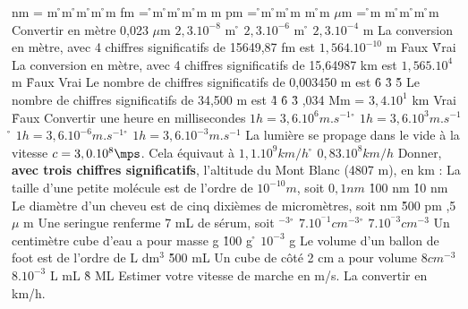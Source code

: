  nm =
\rv
\moinsneuf m
\r
\moinssix m
\r
\moinstrois m
\r
\moinsdouze m
\r
\moinsquinze m
 fm =
\r
\moinsneuf m
\r
\moinssix m
\r
\moinstrois m
\r
\moinsdouze m
\rv
\moinsquinze m
 pm =
\r
\moinsneuf m
\r
\moinssix m
\r
\moinstrois m
\rv
\moinsdouze m
\r
\moinsquinze m
 $\mu$m =
\r
\moinsneuf m
\rv
\moinssix m
\r
\moinstrois m
\r
\moinsdouze m
\r
\moinsquinze m
\q
Convertir en mètre 0,023 $\mu$m
\rv
$2,3. 10^{-8}$ m
\r
$2,3. 10^{-6}$ m
\r
$2,3. 10^{-4}$ m
\q
La conversion en mètre, avec 4 chiffres significatifs de 15649,87 fm est $1,564.10^{-10}$ m
\rv 
Faux
\r
Vrai
\q
La conversion en mètre, avec 4 chiffres significatifs de 15,64987 km est $1,565.10^4$ m
\r 
Faux
\rv
Vrai
\q
Le nombre de chiffres significatifs de 0,003450 m est
\r
6
\r
3
\r
5
\q
Le nombre de chiffres significatifs de 34,500 m est
\r
4
\r
6
\r
3
,034 Mm = $3,4.10^1$ km
\rv
Vrai
\r
Faux
\q
Convertir une heure en millisecondes
\rv
$1 h = 3,6.10^6 m.s^{-1}$
\r
$1 h = 3,6.10^3 m.s^{-1}$
\r
$1 h = 3,6.10^{-6} m.s^{-1}$
\r
$1 h = 3,6.10^{-3} m.s^{-1}$
\q
La lumière se propage dans le vide à  la vitesse $c=3,0.10^8\mps$.
Cela équivaut à  
\rv
$1,1.10^9 km/h$
\r
$0,83.10^8 km/h$
\q 
Donner, \textbf{avec trois chiffres significatifs}, l'altitude du Mont Blanc	(4807 m), en km :
\q
La taille d'une petite molécule	est de l'ordre de $10^{-10} m$, soit
\rv
$0,1 nm$
\r
100 nm
\r
10 nm	
\q
Le diamètre d'un cheveu	est de cinq dixièmes de micromètres, soit
 nm
\r
500 pm
,5 $\mu$ m
\q 
Une seringue renferme 7 mL de sérum, soit
 $^{-3}$
\r
$7.10^{^-1}cm^{-3}$
\r
$7.10^{^-3}cm^{-3}$
\q
Un centimètre cube d'eau a pour masse
 g
\r
100 g
\r
$10^{-3}$ g
\q
Le volume d'un ballon de foot est de l'ordre de 
 L
 dm$^{3}$
\r
500 mL
\q
Un cube de côté 2 cm a pour volume
\rv
$8 cm^{-3}$
\rv
$8.10^{-3}$ L 
 mL
\r
8 ML
\q
Estimer votre vitesse de marche en m/s. La convertir en km/h.
